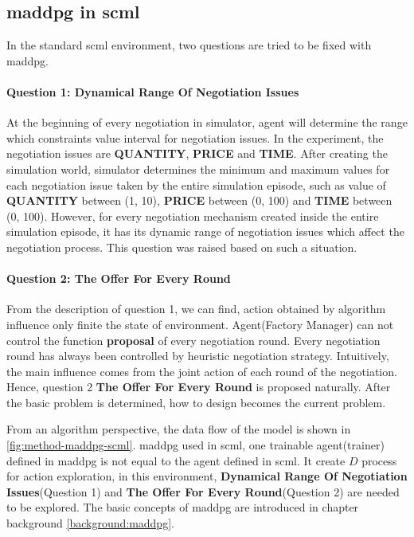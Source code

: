 \subsection{\gls{maddpg} in \gls{scml}} \label{methods:maddpg}
In the standard scml environment, two questions are tried to be fixed with maddpg. 

\paragraph{Question 1: Dynamical Range Of Negotiation Issues}At the beginning of every negotiation in simulator, agent will determine the range which constraints value interval for negotiation issues. In the experiment, the negotiation issues are \textbf{QUANTITY}, \textbf{PRICE} and \textbf{TIME}. After creating the simulation world, simulator determines the minimum and maximum values for each negotiation issue taken by the entire simulation episode, such as value of \textbf{QUANTITY} between (1, 10), \textbf{PRICE} between (0, 100) and \textbf{TIME} between (0, 100). However, for every negotiation mechanism created inside the entire simulation episode, it has its dynamic range of negotiation issues which affect the negotiation process. This question was raised based on such a situation.

\paragraph{Question 2: The Offer For Every Round}From the description of question 1, we can find, action obtained by algorithm influence only finite the state of environment. Agent(Factory Manager) can not control the function \textbf{proposal} of every negotiation round. Every negotiation round has always been controlled by heuristic negotiation strategy. Intuitively, the main influence comes from the joint action of each round of the negotiation. Hence, question 2 \textbf{The Offer For Every Round} is proposed naturally. After the basic problem is determined, how to design becomes the current problem. 

From an algorithm perspective, the data flow of the model is shown in \ref{fig:method-maddpg-scml}. 
\gls{maddpg} used in \gls{scml}, one trainable agent(trainer) defined in \gls{maddpg} is not equal to the agent defined in \gls{scml}.
It create $D$ process for action exploration, in this environment, \textbf{Dynamical Range Of Negotiation Issues}(Question 1) and \textbf{The Offer For Every Round}(Question 2) are needed to be explored.
The basic concepts of \gls{maddpg} are introduced in chapter background \ref{background:maddpg}. 

